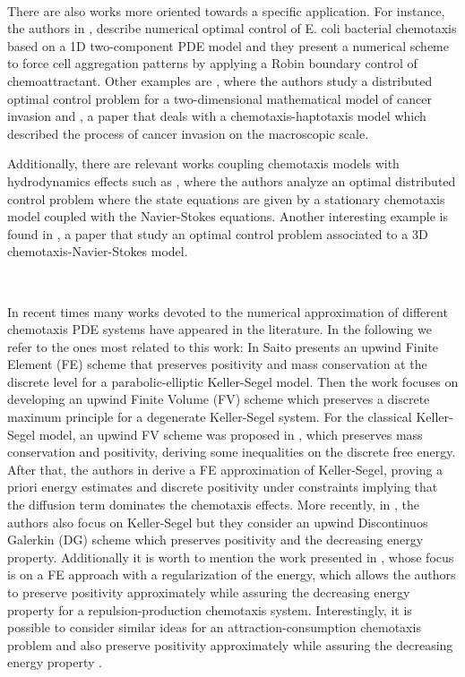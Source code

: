 \documentclass[11pt]{article}
\numberwithin{theorem}{section}
\begin{document}
\



There are also works more oriented towards a specific application. For instance, the authors in \cite{LebiedzMaurer}, describe numerical optimal control of E. coli bacterial chemotaxis based on a 1D two-component PDE model  and they present a numerical scheme to force cell aggregation patterns by applying a Robin boundary  control of chemoattractant. Other examples are \cite{dAdM15}, where the authors study a distributed optimal control problem for a two-dimensional mathematical model of cancer invasion and \cite{TangYuan}, a paper that deals with a chemotaxis-haptotaxis model which described the process of cancer invasion on the macroscopic scale. 

Additionally, there are relevant works coupling chemotaxis models with hydrodynamics effects such as \cite{MADAEJ18}, where the authors analyze an optimal distributed control problem where the state equations are given by a stationary chemotaxis model coupled with the Navier-Stokes equations. Another interesting example is found in \cite{JEJ21}, a paper that study an optimal control problem associated to a 3D chemotaxis-Navier-Stokes model.


\

In recent times many works devoted to the numerical approximation of different chemotaxis PDE systems have appeared in the literature. In the following we refer to the ones most related to this work: In \cite{Saito} Saito presents an upwind Finite Element (FE) scheme that preserves positivity and mass conservation at the discrete level for a parabolic-elliptic Keller-Segel model. Then the work \cite{Saad-et-al-2014} focuses on developing an upwind Finite Volume (FV) scheme which preserves a discrete maximum principle for a degenerate Keller-Segel system. For the classical Keller-Segel model,  an upwind FV  scheme was proposed in \cite{Zhou-Saito}, which preserves mass conservation and positivity, deriving some inequalities on the discrete free energy. 
After that, the authors in \cite{JV-Rafa-KS-FE}  derive a FE approximation of Keller-Segel, proving a priori energy estimates and discrete positivity under constraints implying that the diffusion term dominates the chemotaxis effects. More recently, in \cite{Dani-Rafa-KS-DG-23}, the authors also focus on Keller-Segel but they consider an upwind Discontinuos Galerkin (DG) scheme which preserves positivity and the decreasing energy property. Additionally it is worth to mention the work presented in \cite{Diego-MA-19-FE-RegularizationEnergy}, whose focus is on a FE approach with a regularization of the energy, which allows the authors to preserve positivity approximately while assuring the decreasing energy property for a repulsion-production chemotaxis system. Interestingly, it is possible to consider similar ideas for an attraction-consumption chemotaxis problem and also preserve positivity approximately while assuring the decreasing energy property \cite{G-KS-consumo-24}.
\end{document}
